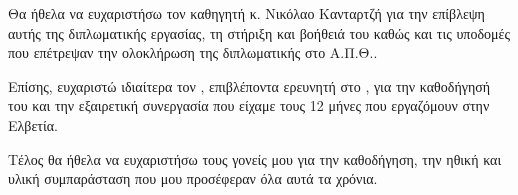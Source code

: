 \begin{acknowledgements}
Θα ήθελα να ευχαριστήσω τον καθηγητή κ. Νικόλαο Κανταρτζή για την επίβλεψη αυτής της διπλωματικής εργασίας, τη στήριξη και βοήθειά του καθώς και τις υποδομές που επέτρεψαν την ολοκλήρωση της διπλωματικής στο Α.Π.Θ..

Επίσης, ευχαριστώ ιδιαίτερα τον , επιβλέποντα ερευνητή στο , για την καθοδήγησή του και την εξαιρετική συνεργασία που είχαμε τους 12 μήνες που εργαζόμουν στην Ελβετία. 

Τέλος θα ήθελα να ευχαριστήσω τους γονείς μου για την καθοδήγηση, την ηθική και υλική συμπαράσταση που μου προσέφεραν όλα αυτά τα χρόνια.
\end{acknowledgements}